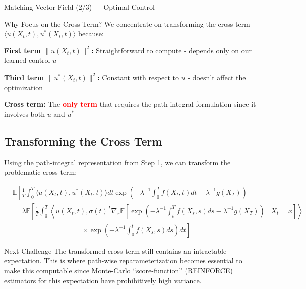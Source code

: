 \documentclass[aspectratio=169,xcolor=dvipsnames]{beamer}
\begin{document}
\begin{frame}[allowframebreaks]{Matching Vector Field (2/3) — Optimal Control}
        \begin{block}{Why Focus on the Cross Term?}
        We concentrate on transforming the cross term $\langle u(X_t,t), u^*(X_t,t)\rangle$ because:
        
        \vspace{0.3cm}
        
        \textbf{First term $\|u(X_t,t)\|^2$:} Straightforward to compute - depends only on our learned control $u$
        
        \vspace{0.3cm}
        
        \textbf{Third term $\|u^*(X_t,t)\|^2$:} Constant with respect to $u$ - doesn't affect the optimization
        
        \vspace{0.3cm}
        
        \textbf{Cross term:} The \textcolor{red}{\textbf{only term}} that requires the path-integral formulation since it involves both $u$ and $u^*$
    \end{block}

    \vspace{0.5cm}
    
    \subsection*{Transforming the Cross Term}
    
    Using the path-integral representation from Step 1, we can transform the problematic cross term:
    
    \begin{equation}
    \begin{aligned}
    &\mathbb{E}\left[\frac{1}{T}\int_0^T \langle u(X_t,t), u^*(X_t,t)\rangle dt \exp\left(-\lambda^{-1}\int_0^T f(X_t,t) dt - \lambda^{-1}g(X_T)\right)\right] \\[8pt]
    &= \lambda \mathbb{E}\left[\frac{1}{T}\int_0^T \left\langle u(X_t,t), \sigma(t)^T \nabla_x \mathbb{E}\left[\exp\left(-\lambda^{-1}\int_t^T f(X_s,s) ds - \lambda^{-1}g(X_T)\right) \middle| X_t = x\right]\right\rangle \right. \\[4pt]
    &\qquad\qquad\qquad\qquad\qquad \left. \times \exp\left(-\lambda^{-1}\int_0^t f(X_s,s) ds\right) dt\right]
    \end{aligned}
    \end{equation}
    
    \vspace{0.5cm}
    
    \begin{alertblock}{Next Challenge}
        The transformed cross term still contains an intractable expectation. This is where path-wise reparameterization becomes essential to make this computable since
        Monte-Carlo “score-function” (REINFORCE) estimators for this expectation have prohibitively high variance.
    \end{alertblock}


    
    

\end{frame}
\end{document}
